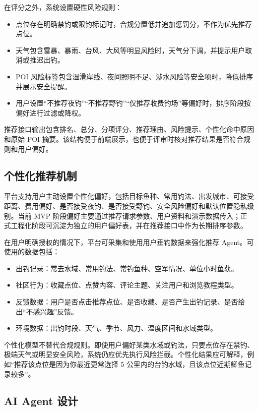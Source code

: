 在评分之外，系统设置硬性风险规则：

\begin{itemize}
  \item 点位存在明确禁钓或限钓标记时，合规分置低并追加惩罚分，不作为优先推荐点位。
  \item 天气包含雷暴、暴雨、台风、大风等明显风险时，天气分下调，并提示用户取消或推迟出钓。
  \item POI 风险标签包含湿滑岸线、夜间照明不足、涉水风险等安全项时，降低排序并展示安全提醒。
  \item 用户设置“不推荐夜钓”“不推荐野钓”“仅推荐收费钓场”等偏好时，排序阶段按偏好进行过滤或降权。
\end{itemize}

推荐接口输出包含排名、总分、分项评分、推荐理由、风险提示、个性化命中原因和原始 POI 摘要。该结构便于前端展示，也便于评审时核对推荐结果是否符合规则和用户偏好。

\subsection{个性化推荐机制}

平台支持用户主动设置个性化偏好，包括目标鱼种、常用钓法、出发城市、可接受距离、费用偏好、是否接受夜钓、是否接受野钓、安全风险偏好和默认位置隐私级别。当前 MVP 阶段偏好主要通过推荐请求参数、用户资料和演示数据传入；正式工程化阶段可沉淀为独立的用户偏好表，并在推荐接口中作为长期排序参数。

在用户明确授权的情况下，平台可采集和使用用户垂钓数据来强化推荐 Agent。可使用的数据包括：

\begin{itemize}
  \item 出钓记录：常去水域、常用钓法、常钓鱼种、空军情况、单位小时鱼获。
  \item 社区行为：收藏点位、点赞内容、评论主题、关注用户和浏览教程类型。
  \item 反馈数据：用户是否点击推荐点位、是否收藏、是否产生出钓记录、是否给出“不感兴趣”反馈。
  \item 环境数据：出钓时段、天气、季节、风力、温度区间和水域类型。
\end{itemize}

个性化模型不替代合规规则。即使用户偏好某类水域或钓法，只要点位存在禁钓、极端天气或明显安全风险，系统仍应优先执行风险拦截。个性化结果应可解释，例如“推荐该点位是因为你最近更常选择 5 公里内的台钓水域，且该点位近期鲫鱼记录较多”。

\subsection{AI Agent 设计}

